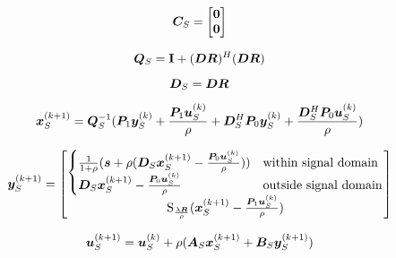 \documentclass{article}
\begin{document}
\begin{equation}
\bm{C}_S = \begin{bmatrix} \bm{0} \\ \bm{0} \end{bmatrix}
\end{equation}

\begin{equation}
\bm{Q}_S = {\bf I} + (\bm{D}\bm{R})^H(\bm{D}\bm{R})
\end{equation}

\begin{equation}
\bm{D}_S = \bm{D}\bm{R}
\end{equation}



\begin{equation}
\bm{x}_S^{(k + 1)} = \bm{Q}_S^{-1}(\bm{P}_1\bm{y}_S^{(k)} + \frac{\bm{P}_1\bm{u}_S^{(k)}}{\rho} + \bm{D}_S^H\bm{P}_0\bm{y}_S^{(k)} + \frac{\bm{D}_S^H\bm{P}_0\bm{u}_S^{(k)}}{\rho})
\end{equation}

\begin{equation}
\vy_S^{(k + 1)} = \begin{bmatrix}
\begin{cases}
\frac{1}{1 + \rho}(\vs + \rho(\mD_S\vx_S^{(k + 1)} - \frac{\mP_0\vu_S^{(k)}}{\rho})) & \text{within signal domain}\\
\mD_S\vx_S^{(k + 1)} - \frac{\mP_0\vu_S^{(k)}}{\rho} & \text{outside signal domain}
\end{cases} \\
\operatorname{S}_{\frac{\lambda\mR}{\rho}}(\vx_S^{(k+1)} - \frac{\mP_1\vu_S^{(k)}}{\rho})

\end{bmatrix}

\end{equation}


\begin{equation}
\bm{u}_S^{(k + 1)} = \bm{u}_S^{(k)} + \rho(\bm{A}_S\bm{x}_S^{(k + 1)} + \bm{B}_S\bm{y}_S^{(k + 1)})
\end{equation}
\end{document}

